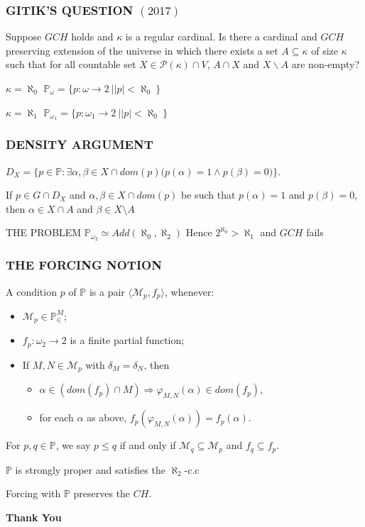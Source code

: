 \documentclass{beamer}
\begin{document}
\begin{frame}
\frametitle{GITIK'S QUESTION $(2017)$}

Suppose $GCH$ holds and $\kappa$ is a regular cardinal. Is there a cardinal and $GCH$ preserving extension of the universe in which there exists a set $A \subseteq \kappa$ of size $\kappa$ such that for all countable set $X \in \mathscr{P}(\kappa) \cap V$, $A \cap X$ and $X\backslash A$ are non-empty?
\pause
\begin{block}{$\kappa= \aleph_0$}
$\mathbb{P}_{\omega} = \{p:\omega \longrightarrow 2 \ | |p| < \aleph_0 \ \}$
\end{block}
\begin{block}{$\kappa= \aleph_1$}
$\mathbb{P}_{\omega_1} = \{p:\omega_1 \longrightarrow 2 \ | |p| < \aleph_0 \ \}$
\end{block}
\end{frame}
\begin{frame}
\frametitle{DENSITY ARGUMENT}
\begin{block}{}
 $D_X= \{p \in \mathbb{P}: \exists \alpha, \beta \in X \cap dom(p) \big(p(\alpha)=1 \land p(\beta)=0 \big) \}$. 
\end{block}
\begin{block}{}
If $p \in G \cap D_X$ and $\alpha, \beta \in X \cap dom(p)$ be such that $p(\alpha)=1$ and $p(\beta)=0 $, then $\alpha \in X \cap A$ and $\beta \in X \setminus A$
\end{block}
\pause
\begin{block}{THE PROBLEM}
$\mathbb{P}_{\omega_2} \simeq Add(\aleph_0, \aleph_2)$ Hence $2^{\aleph_0}> \aleph_1$ and $GCH$ fails
\end{block}
\end{frame}
\begin{frame}
\frametitle{THE FORCING NOTION}
\begin{definition}
A condition $p$ of $\mathbb{P}$ is a pair $\langle \mathcal{M}_p, f_p \rangle$, whenever:
\begin{itemize}
\item[$(i)$] $\mathcal{M}_p \in \mathbb{P}_{\in}^M$;
\item[$(ii)$] $f_p: \omega_2 \longrightarrow 2$ is a finite partial function;
\item[$(iii)$] If $M,N \in \mathcal{M}_p$ with $\delta_M=\delta_N$, then
 \begin{itemize}
\item $\alpha \in (dom(f_p) \cap M) \Rightarrow \varphi_{M,N}(\alpha) \in dom(f_p)$,
\item for each $\alpha$ as above, $f_p(\varphi_{M,N}(\alpha))=f_p(\alpha)$.
\end{itemize}
\end{itemize}
For $p, q \in \mathbb{P}$, we say $p \leq q$ if and only if $\mathcal{M}_q \subseteq \mathcal{M}_p$ and $f_q \subseteq f_p$.
\end{definition}
\begin{lemma}
$\mathbb{P}$ is strongly proper and satisfies the $\aleph_2$-c.c
\end{lemma}
\begin{lemma}
Forcing with $\mathbb{P}$ preserves the $CH$.
\end{lemma}
\end{frame}
\begin{frame}
\begin{center}
\textbf{{\Huge Thank You}}
\end{center}
\end{frame}
\end{document}
